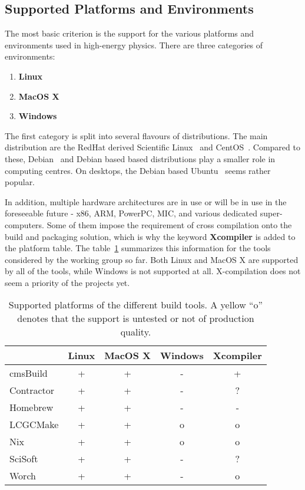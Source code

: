 \documentclass[12pt,a4paper]{article}
\begin{document}
\subsection{Supported Platforms and Environments}
The most basic criterion is the support for the various platforms and environments used in high-energy physics. There are three categories of environments:
\begin{enumerate}
\item \textbf{Linux}
\item \textbf{MacOS X}
\item \textbf{Windows}
\end{enumerate}
The first category is split into several flavours of distributions. The main distribution are the RedHat derived Scientific Linux~\cite{sl} and CentOS~\cite{centos}. Compared to these, Debian~\cite{debian} and Debian based based distributions play a smaller role in computing centres. On desktops, the Debian based Ubuntu~\cite{ubuntu} seems rather popular.  

In addition, multiple hardware architectures are in use or will be in use in the foreseeable future - x86, ARM, PowerPC, MIC, and various dedicated super-computers. Some of them impose the requirement of cross compilation onto the build and packaging solution, which is why the keyword \textbf{Xcompiler} is added to the platform table.
The table~\ref{tab:taxonomyPlatforms} summarizes this information for the tools considered by the working group so far. Both Linux and MacOS X are supported by all of the tools, while Windows is not supported at all. X-compilation does not seem a priority of the projects yet.

\begin{table}
\centering
\begin{tabular}{lcccc}
& Linux & MacOS X & Windows & Xcompiler \\ \hline
cmsBuild & \cellcolor{green} + & \cellcolor{green} + & \cellcolor{red} - & \cellcolor{green} +  \\
Contractor & \cellcolor{green} + & \cellcolor{green} + & \cellcolor{red} - & ?\\
Homebrew & \cellcolor{green} + & \cellcolor{green} + & \cellcolor{red} - & \cellcolor{red} -\\
LCGCMake & \cellcolor{green} + & \cellcolor{green} + & \cellcolor{yellow} o   & \cellcolor{yellow} o \\
Nix & \cellcolor{green} + & \cellcolor{green} + & \cellcolor{yellow} o  & \cellcolor{yellow} o \\
SciSoft &  \cellcolor{green} + & \cellcolor{green} + & \cellcolor{red} - & ? \\
Worch &  \cellcolor{green} + &  \cellcolor{green}  + & \cellcolor{red} -  &  \cellcolor{yellow} o
\end{tabular}
\caption{\label{tab:taxonomyPlatforms}Supported platforms of the different build tools. A yellow ``o'' denotes that the support is untested or not of production quality.}
\end{table}
\end{document}
